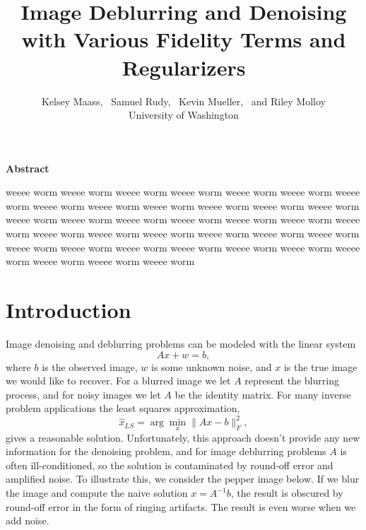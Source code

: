 \documentclass[10pt,a4paper]{article}
\begin{document}
\title{Image Deblurring and Denoising \\with Various Fidelity Terms and Regularizers}
\author{
Kelsey Maass, ~Samuel Rudy, ~Kevin Mueller, ~and Riley Molloy\\
University of Washington\\
}

\maketitle

\begin{center}
\begin{minipage}{0.8\textwidth}
\begin{center}
\textbf{Abstract}
\end{center}
weeee worm weeee worm weeee worm weeee worm weeee worm weeee worm weeee worm weeee worm weeee worm weeee worm weeee worm weeee worm weeee worm weeee worm weeee worm weeee worm weeee worm weeee worm weeee worm weeee worm weeee worm weeee worm weeee worm weeee worm weeee worm weeee worm weeee worm weeee worm weeee worm weeee worm weeee worm weeee worm weeee worm weeee worm weeee worm weeee worm 
\end{minipage}
\end{center}

\section{Introduction}

Image denoising and deblurring problems can be modeled with the linear system
\begin{equation}
Ax + w = b,
\end{equation}
where $b$ is the observed image, $w$ is some unknown noise, and $x$ is the true image we would like to recover. For a blurred image we let $A$ represent the blurring process, and for noisy images we let $A$ be the identity matrix. For many inverse problem applications the least squares approximation, 
\begin{equation}
\hat{x}_{LS} = \arg\min_x \| Ax - b \|_F^2 ,
\end{equation}
gives a reasonable solution. Unfortunately, this approach doesn't provide any new information for the denoising problem, and for image deblurring problems $A$ is often ill-conditioned, so the solution is contaminated by round-off error and amplified noise. To illustrate this, we consider the pepper image below. If we blur the image and compute the naive solution $x = A^{-1}b$, the result is obscured by round-off error in the form of ringing artifacts. The result is even worse when we add noise.
\end{document}
